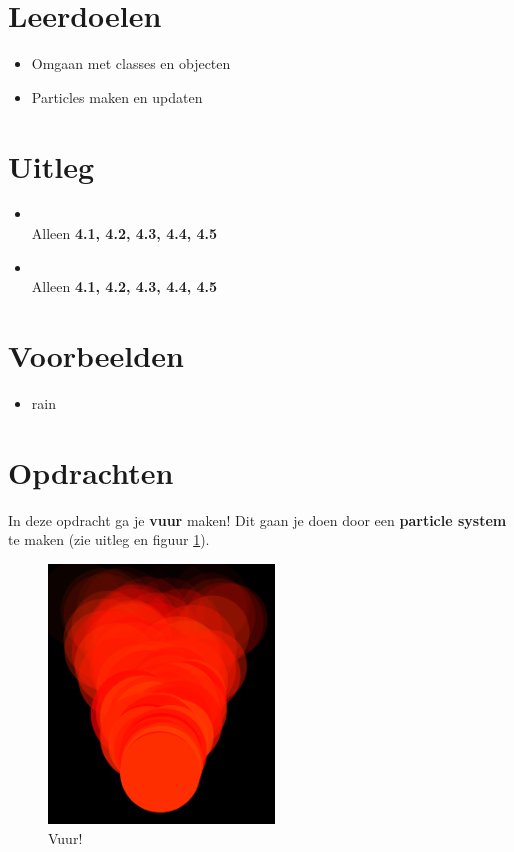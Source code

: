\documentclass{../qh_exercise}
\begin{document}
\section{Leerdoelen}
\begin{itemize}
\item Omgaan met classes en objecten
\item Particles maken en updaten
\end{itemize}

\section{Uitleg}
\begin{itemize}
\item {}\\
    Alleen \textbf{4.1, 4.2, 4.3, 4.4, 4.5}
    \item {}\\
    Alleen \textbf{4.1, 4.2, 4.3, 4.4, 4.5}\\
\end{itemize}

\section{Voorbeelden}
\begin{itemize}
    \item rain
\end{itemize}

\newpage
\section{Opdrachten}
In deze opdracht ga je \textbf{vuur} maken! Dit gaan je doen door een \textbf{particle system} te maken (zie uitleg en figuur \ref{fig:fire}).

\begin{figure}[H]
	\centering
	\includegraphics[width=6cm]{fire.png}
	\caption{Vuur!}
	\label{fig:fire}
\end{figure}
\end{document}
